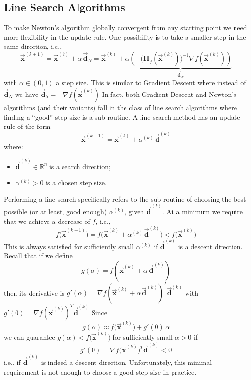 \documentclass[9pt, headings=standardclasses, parskip=half]{scrartcl}
\renewcommand{\emph}[1]{\textcolor{mypurple}{#1}}
\newcommand{\matr}[1]{\underline{\boldsymbol{#1}}}
\newcommand{\vect}[1]{\vec{\boldsymbol{#1}}}
\begin{document}

\subsection{Line Search Algorithms}

To make Newton's algorithm globally convergent from any starting point we need more flexibility in the update rule. One possibility is to take a smaller step in the same direction, i.e.,
\[
\vect{x}^{(k+1)} = \vect{x}^{(k)} + \alpha\, \vect{d}_{N} = \vect{x}^{(k)} + \alpha 
\underbrace{
\left(-\big(\matr{H}_{f}(\vect{x}^{(k)})\big)^{-1}\nabla f(\vect{x}^{(k)})\right) 
}_{\vect{d}_{N}}
\]
with \(\alpha \in (0,1)\) a step size. This is similar to Gradient Descent where instead of 
\(
\vect{d}_{N} %
\)
we have
\(
\vect{d}_{S} = -\nabla f(\vect{x}^{(k)}) %
\)
In fact, both Gradient Descent and Newton's algorithms (and their variants) fall in the class of \emph{line search} algorithms where finding a “good” step size is a sub-routine. A line search method has an update rule of the form
\[
\vect{x}^{(k+1)} = \vect{x}^{(k)} + \alpha^{(k)}\, \vect{d}^{(k)} %
\]
where:
\begin{itemize}
  \item \(\vect{d}^{(k)} \in \mathbb{R}^n\) is a search direction;
  \item \(\alpha^{(k)} > 0\) is a chosen step size.
\end{itemize}

Performing a line search specifically refers to the sub-routine of choosing the best possible (or at least, good enough) \(\alpha^{(k)}\), given \(\vect{d}^{(k)}\). 
At a minimum we require that we achieve a decrease of \(f\), i.e.,
\[
f\bigl(\vect{x}^{(k+1)}\bigr) = f\bigl(\vect{x}^{(k)} + \alpha^{(k)}\,\vect{d}^{(k)}\bigr) < f\bigl(\vect{x}^{(k)}\bigr) %
\]
This is always satisfied for sufficiently small \(\alpha^{(k)}\) if \(\vect{d}^{(k)}\) is a descent direction. 
Recall that if we define
\[
g(\alpha) = f(\vect{x}^{(k)} + \alpha\, \vect{d}^{(k)}) %
\]
then its derivative is
\(
g'(\alpha) = \nabla f(\vect{x}^{(k)} + \alpha\, \vect{d}^{(k)})^T \vect{d}^{(k)} %
\)
with
\(
g'(0) = \nabla f(\vect{x}^{(k)})^T \vect{d}^{(k)} %
\)
Since
\[
g(\alpha) \approx f\bigl(\vect{x}^{(k)}\bigr) + g'(0)\,\alpha %
\]
we can guarantee \(g(\alpha) < f\bigl(\vect{x}^{(k)}\bigr)\) for sufficiently small \(\alpha>0\) if
\[
g'(0) = \nabla f\bigl(\vect{x}^{(k)}\bigr)^T \vect{d}^{(k)} < 0 %
\]
i.e., if \(\vect{d}^{(k)}\) is indeed a descent direction. Unfortunately, this minimal requirement is not enough to choose a good step size in practice.
\end{document}
